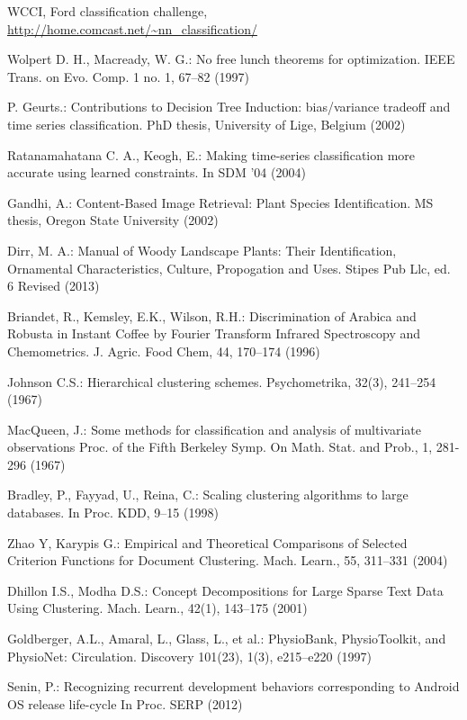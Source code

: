 \documentclass{llncs}
\begin{document}
\begin{thebibliography}{5}
WCCI, Ford classification challenge,
\url{http://home.comcast.net/~nn_classification/}

Wolpert D. H., Macready, W. G.:
No free lunch theorems for optimization.
IEEE Trans. on Evo. Comp. 1 no. 1, 67--82 (1997)

P. Geurts.:
Contributions to Decision Tree Induction: bias/variance tradeoff and time series classification.
PhD thesis, University of Lige, Belgium (2002)

Ratanamahatana C. A., Keogh, E.:
Making time-series classification more accurate using learned constraints. 
In SDM '04 (2004)

Gandhi, A.:
Content-Based Image Retrieval: Plant Species Identification. 
MS thesis, Oregon State University (2002)

Dirr, M. A.:
Manual of Woody Landscape Plants: Their Identification, Ornamental Characteristics,
Culture, Propogation and Uses.
Stipes Pub Llc, ed. 6 Revised (2013)

Briandet, R., Kemsley, E.K., Wilson, R.H.:
Discrimination of Arabica and Robusta in Instant Coffee by Fourier Transform Infrared Spectroscopy
and Chemometrics.
J. Agric. Food Chem, 44, 170--174 (1996)

Johnson C.S.:
Hierarchical clustering schemes.
Psychometrika, 32(3), 241--254 (1967)

MacQueen, J.:
Some methods for classification and analysis of multivariate observations
Proc. of the Fifth Berkeley Symp. On  Math. Stat. and Prob., 1, 281-296 (1967)

Bradley, P., Fayyad, U., Reina, C.:
Scaling clustering algorithms to large databases. 
In Proc. KDD, 9--15 (1998)
\enlargethispage{0.5cm} 

Zhao Y, Karypis G.:
Empirical and Theoretical Comparisons of Selected Criterion Functions for Document Clustering.
Mach. Learn., 55, 311--331 (2004)

Dhillon I.S., Modha D.S.:
Concept Decompositions for Large Sparse Text Data Using Clustering.
Mach. Learn., 42(1), 143--175 (2001)

Goldberger, A.L., Amaral, L., Glass, L., et al.: PhysioBank, PhysioToolkit, and 
PhysioNet: Circulation. Discovery 101(23), 1(3), e215–e220 (1997) 

Senin, P.: 
Recognizing recurrent development behaviors corresponding to Android OS release life-cycle
In Proc. SERP (2012)



\end{thebibliography}
\end{document}
